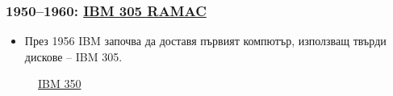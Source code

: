 \documentclass[ignorenonframetext, hyperref=unicode]{beamer}
\begin{document}
\begin{frame}
\frametitle{1950--1960: \href{http://en.wikipedia.org/wiki/IBM_305_RAMAC}{IBM 305 RAMAC}}
\begin{itemize}
\item През 1956 IBM започва да доставя първият компютър, използващ твърди
дискове -- IBM 305.
\end{itemize}
\begin{figure}[h]
\center
\hfill{}%
\hfill{}\hfill
\caption{\href{http://en.wikipedia.org/wiki/Early_IBM_disk_storage\#IBM_350}{IBM 350}}
\end{figure}
\end{frame}
\end{document}
